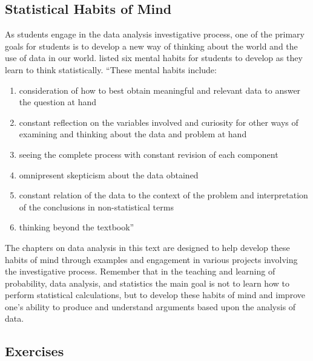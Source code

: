 \documentclass[
]{book}
\providecommand{\tightlist}{%
  \setlength{\itemsep}{0pt}\setlength{\parskip}{0pt}}
\theoremstyle{definition}
\theoremstyle{definition}
\theoremstyle{definition}
\theoremstyle{definition}
\theoremstyle{remark}
\begin{document}
\hypertarget{statistical-habits-of-mind}{%
\subsection{Statistical Habits of Mind}\label{statistical-habits-of-mind}}

As students engage in the data analysis investigative process, one of the primary goals for students is to develop a new way of thinking about the world and the use of data in our world. \citet{Chance2002} listed six mental habits for students to develop as they learn to think statistically. ``These mental habits include:

\begin{enumerate}
\def\labelenumi{\arabic{enumi}.}
\tightlist
\item
  consideration of how to best obtain meaningful and relevant data to answer the question at hand
\item
  constant reflection on the variables involved and curiosity for other ways of examining and thinking about the data and problem at hand
\item
  seeing the complete process with constant revision of each component
\item
  omnipresent skepticism about the data obtained
\item
  constant relation of the data to the context of the problem and interpretation of the conclusions in non-statistical terms
\item
  thinking beyond the textbook''
\end{enumerate}

The chapters on data analysis in this text are designed to help develop these habits of mind through examples and engagement in various projects involving the investigative process. Remember that in the teaching and learning of probability, data analysis, and statistics the main goal is not to learn how to perform statistical calculations, but to develop these habits of mind and improve one's ability to produce and understand arguments based upon the analysis of data.

\hypertarget{exercises-59}{%
\subsection{Exercises}\label{exercises-59}}
\end{document}
